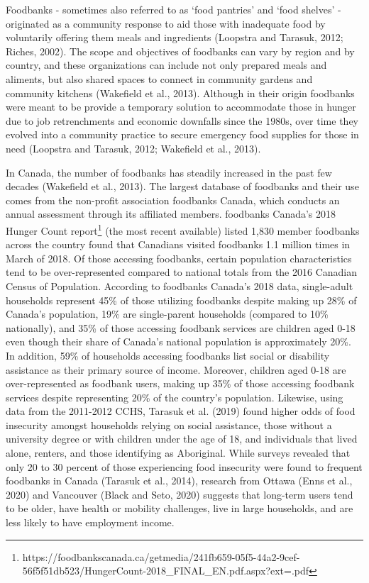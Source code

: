 \documentclass[]{elsarticle} %
\begin{document}
Foodbanks - sometimes also referred to as `food pantries' and `food
shelves' - originated as a community response to aid those with
inadequate food by voluntarily offering them meals and ingredients
(Loopstra and Tarasuk, 2012; Riches, 2002). The scope and objectives of
foodbanks can vary by region and by country, and these organizations can
include not only prepared meals and aliments, but also shared spaces to
connect in community gardens and community kitchens (Wakefield et al.,
2013). Although in their origin foodbanks were meant to be provide a
temporary solution to accommodate those in hunger due to job
retrenchments and economic downfalls since the 1980s, over time they
evolved into a community practice to secure emergency food supplies for
those in need (Loopstra and Tarasuk, 2012; Wakefield et al., 2013).

In Canada, the number of foodbanks has steadily increased in the past
few decades (Wakefield et al., 2013). The largest database of foodbanks
and their use comes from the non-profit association foodbanks Canada,
which conducts an annual assessment through its affiliated members.
foodbanks Canada's 2018 Hunger Count report\footnote{https://foodbankscanada.ca/getmedia/241fb659-05f5-44a2-9cef-56f5f51db523/HungerCount-2018\_FINAL\_EN.pdf.aspx?ext=.pdf}
(the most recent available) listed 1,830 member foodbanks across the
country found that Canadians visited foodbanks 1.1 million times in
March of 2018. Of those accessing foodbanks, certain population
characteristics tend to be over-represented compared to national totals
from the 2016 Canadian Census of Population. According to foodbanks
Canada's 2018 data, single-adult households represent 45\% of those
utilizing foodbanks despite making up 28\% of Canada's population, 19\%
are single-parent households (compared to 10\% nationally), and 35\% of
those accessing foodbank services are children aged 0-18 even though
their share of Canada's national population is approximately 20\%. In
addition, 59\% of households accessing foodbanks list social or
disability assistance as their primary source of income. Moreover,
children aged 0-18 are over-represented as foodbank users, making up
35\% of those accessing foodbank services despite representing 20\% of
the country's population. Likewise, using data from the 2011-2012 CCHS,
Tarasuk et al. (2019) found higher odds of food insecurity amongst
households relying on social assistance, those without a university
degree or with children under the age of 18, and individuals that lived
alone, renters, and those identifying as Aboriginal. While surveys
revealed that only 20 to 30 percent of those experiencing food
insecurity were found to frequent foodbanks in Canada (Tarasuk et al.,
2014), research from Ottawa (Enns et al., 2020) and Vancouver (Black and
Seto, 2020) suggests that long-term users tend to be older, have health
or mobility challenges, live in large households, and are less likely to
have employment income.
\end{document}
